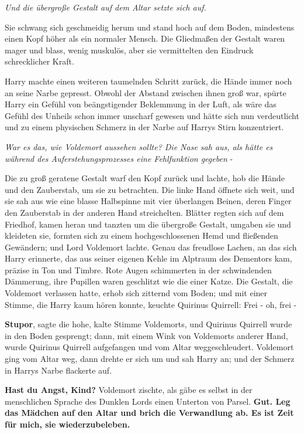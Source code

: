 \emph{Und die übergroße Gestalt auf dem
Altar setzte sich auf.}

Sie schwang sich geschmeidig herum und stand hoch auf dem Boden, mindestens
einen Kopf höher als ein normaler Mensch. Die Gliedmaßen der Gestalt waren mager
und blass, wenig muskulös, aber sie vermittelten den Eindruck schrecklicher
Kraft.

Harry machte einen weiteren taumelnden Schritt zurück, die Hände immer noch an
seine Narbe gepresst. Obwohl der Abstand zwischen ihnen groß war, spürte Harry
ein Gefühl von beängstigender Beklemmung in der Luft, als wäre das Gefühl des
Unheils schon immer unscharf gewesen und hätte sich nun verdeutlicht und zu
einem physischen Schmerz in der Narbe auf Harrys Stirn konzentriert.

\emph{War es das, wie Voldemort aussehen sollte? Die Nase sah aus, als hätte es
während des Auferstehungsprozesses eine Fehlfunktion gegeben} -

Die zu groß geratene Gestalt warf den Kopf zurück und lachte, hob die Hände und
den Zauberstab, um sie zu betrachten. Die linke Hand öffnete sich weit, und sie
sah aus wie eine blasse Halbspinne mit vier überlangen Beinen, deren Finger den
Zauberstab in der anderen Hand streichelten. Blätter regten sich auf dem
Friedhof, kamen heran und tanzten um die übergroße Gestalt, umgaben sie und
kleideten sie, formten sich zu einem hochgeschlossenen Hemd und fließenden
Gewändern; und Lord Voldemort lachte. Genau das freudlose Lachen, an das sich
Harry erinnerte, das aus seiner eigenen Kehle im Alptraum des Dementors kam,
präzise in Ton und Timbre. Rote Augen schimmerten in der schwindenden Dämmerung,
ihre Pupillen waren geschlitzt wie die einer Katze. Die Gestalt, die Voldemort
verlassen hatte, erhob sich zitternd vom Boden; und mit einer Stimme, die Harry
kaum hören konnte, keuchte Quirinus Quirrell: \glqq{}Frei - oh, frei -\grqq{}

\glqq{}\textbf{Stupor}\grqq{}, sagte die hohe, kalte Stimme Voldemorts, und
Quirinus Quirrell wurde in den Boden gesprengt; dann, mit einem Wink von
Voldemorts anderer Hand, wurde Quirinus Quirrell aufgefangen und vom Altar
weggeschleudert. Voldemort ging vom Altar weg, dann drehte er sich um und sah
Harry an; und der Schmerz in Harrys Narbe flackerte auf.

\glqq{}\textbf{Hast du Angst, Kind?}\grqq{} Voldemort zischte, als gäbe es selbst
in der menschlichen Sprache des Dunklen Lords einen Unterton von Parsel. \glqq{}
\textbf{Gut. Leg das Mädchen auf den Altar und brich die Verwandlung ab. Es ist
Zeit für mich, sie wiederzubeleben.}\grqq{}

